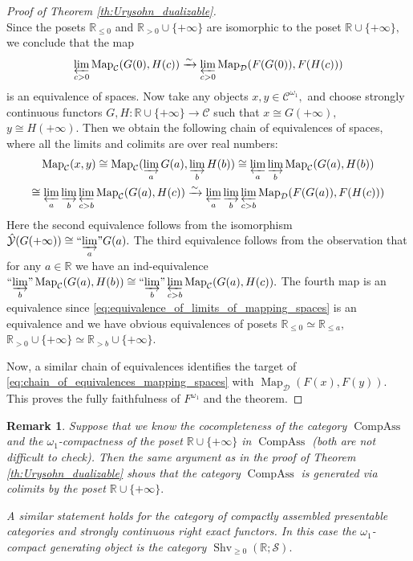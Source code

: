 \documentclass[11pt,leqno]{amsart}
\newtheorem{remark}[theo]{Remark}
\numberwithin{equation}{section}
\def\R{\mathbb{R}}
\def\Map{\operatorname{Map}}
\newcommand{\indlim}[1][]{\mathop{\varinjlim}\limits_{#1}}
\newcommand{\inddlim}[1][]{{``{\indlim[#1]}"}}
\newcommand{\prolim}[1][]{\mathop{\varprojlim}\limits_{#1}}
\newcommand{\xto}{\xrightarrow}
\newcommand{\cD}{{\mathcal D}}
\newcommand{\cC}{{\mathcal C}}
\newcommand{\cY}{{\mathcal Y}}
\newcommand{\cS}{{\mathcal S}}
\newcommand{\Compass}{\operatorname{CompAss}}
\newcommand{\Shv}{\operatorname{Shv}}
\begin{document}
\begin{proof}[Proof of Theorem \ref{th:Urysohn_dualizable}]
\begin{equation*}
	\end{equation*}
	Since the posets $\R_{\leq 0}$ and $\R_{>0}\cup\{+\infty\}$ are isomorphic to the poset $\R\cup\{+\infty\},$ we conclude that the map 
	\begin{equation}\label{eq:equivalence_of_limits_of_mapping_spaces}
	\prolim[c>0]\Map_{\cC}(G(0),H(c))\xto{\sim} \prolim[c>0]\Map_{\cD}(F(G(0)),F(H(c)))
	\end{equation} is an equivalence of spaces. Now take any objects $x,y\in\cC^{\omega_1},$ and choose strongly continuous functors $G,H:\R\cup\{+\infty\}\to\cC$ such that $x\cong G(+\infty),$ $y\cong H(+\infty).$ Then we obtain the following chain of equivalences of spaces, where all the limits and colimits are over real numbers:
	\begin{multline}\label{eq:chain_of_equivalences_mapping_spaces}
	\Map_{\cC}(x,y)\cong \Map_{\cC}(\indlim[a]G(a),\indlim[b]H(b))\cong \prolim[a]\indlim[b]\Map_{\cC}(G(a),H(b))\\
	\cong \prolim[a]\indlim[b]\prolim[c>b]\Map_{\cC}(G(a),H(c))\xto{\sim} \prolim[a]\indlim[b]\prolim[c>b]\Map_{\cD}(F(G(a)),F(H(c))) 
	\end{multline}
	Here the second equivalence follows from the isomorphism $\hat{\cY}(G(+\infty))\cong\inddlim[a]G(a).$ The third equivalence follows from the observation that for any $a\in\R$ we have an ind-equivalence $\inddlim[b]\Map_{\cC}(G(a),H(b))\cong \inddlim[b]\prolim[c>b]\Map_{\cC}(G(a),H(c)).$ The fourth map is an equivalence since \eqref{eq:equivalence_of_limits_of_mapping_spaces} is an equivalence and we have obvious equivalences of posets $\R_{\leq 0}\simeq \R_{\leq a},$ $\R_{>0}\cup\{+\infty\}\simeq \R_{>b}\cup\{+\infty\}.$
	
	Now, a similar chain of equivalences identifies the target of \eqref{eq:chain_of_equivalences_mapping_spaces} with $\Map_{\cD}(F(x),F(y)).$ This proves the fully faithfulness of $F^{\omega_1}$ and the theorem.
\end{proof}

\begin{remark}\label{rem:Urysohn_for_Compass} Suppose that we know the cocompleteness of the category $\Compass$ and the $\omega_1$-compactness of the poset $\R\cup\{+\infty\}$ in $\Compass$ (both are not difficult to check). Then the same argument as in the proof of Theorem \ref{th:Urysohn_dualizable} shows that the category $\Compass$ is generated via colimits by the poset $\R\cup\{+\infty\}.$
	
A similar statement holds for the category of compactly assembled presentable categories and strongly continuous right exact functors. In this case the $\omega_1$-compact generating object is the category $\Shv_{\geq 0}(\R;\cS).$\end{remark}
\end{document}
